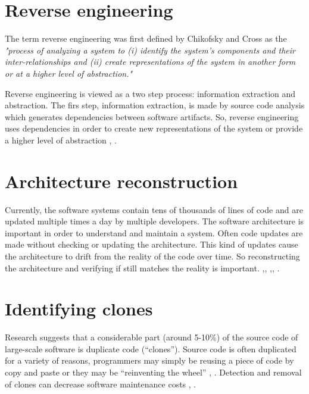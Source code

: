 \documentclass[12pt]{mitthesis}
\begin{document}
\section{Reverse engineering}
The term reverse engineering was first defined by Chikofsky and Cross \cite{ChikofskyReverse} as the \textit{"process of analyzing a system to (i) identify the system’s components and
their inter-relationships and (ii) create representations of the system in another form or at a higher level of abstraction."} 

Reverse engineering is viewed as a two step process: information extraction and abstraction. \cite{FoSEReverseEngineering} 
The firs step, information extraction, is made by source code analysis which generates dependencies between software artifacts. So, reverse engineering uses dependencies in order to create new representations of the system or provide a higher level of abstraction \cite{struct_dep}, \cite{Gueheneuc}.

\section{Architecture reconstruction}
Currently, the software systems contain tens of thousands of lines of code and are updated multiple times a day by multiple developers.  
The software architecture is important in order to understand and maintain a system. Often code updates are made without checking or updating the architecture.
This kind of updates cause the architecture to drift from the reality of the code over time. So reconstructing the architecture and verifying if still matches the reality is important. \cite{sar},\cite{PagerankENASE}, \cite{Bass-archreconstruction} ,\cite{RecoverySartipi}, \cite{model-bennett}.

\section{Identifying clones}
Research suggests that a considerable part (around 5-10\%) of the source code of large-scale software is duplicate code (“clones”). Source code is often duplicated for a variety of reasons, programmers may simply be reusing a piece of code by copy and paste or they may be “reinventing the wheel” \cite{ClonesMayrand}, \cite{clones}.
Detection and removal of clones can decrease software maintenance costs \cite{CloneDetection}, \cite{cloneKamiya}.
\end{document}
